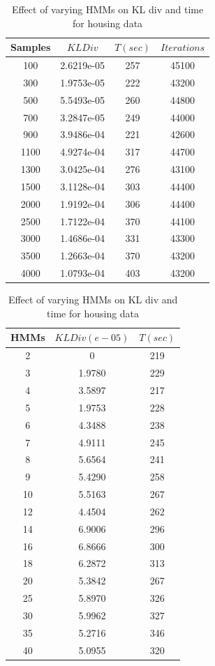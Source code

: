 \documentclass[conference]{IEEEtran}
\begin{document}
\begin{table}[htdp]
\parbox{.51\linewidth}{
\centering
\begin{tabular}{| c | c | c | c |}
\hline
Samples & $KL Div$ & $T(sec)$ & $Iterations$ \\
\hline
100 & 2.6219e-05 & 257 & 45100 \\
300 & 1.9753e-05 & 222 & 43200 \\
500 & 5.5493e-05 & 260 & 44800 \\
700 & 3.2847e-05 & 249 & 44000 \\
900 & 3.9486e-04 & 221 & 42600 \\
1100 & 4.9274e-04 & 317 & 44700 \\
1300 & 3.0425e-04 & 276 & 43100 \\
1500 &  3.1128e-04 & 303 & 44400\\
2000 & 1.9192e-04 & 306 & 44400\\
2500 & 1.7122e-04 & 370 & 44100 \\
3000 & 1.4686e-04 & 331 & 43300 \\
3500 & 1.2663e-04 & 370 & 43200 \\
4000 & 1.0793e-04 & 403 & 43200 \\
\hline
\end{tabular}
\caption{Effect of varying samples on KL div for housing data}
\label{table:sample2}
}
\hfill
\parbox{.51\linewidth}{
\centering
\begin{tabular}{| c | c | c |}
\hline
HMMs & $KL Div (e-05)$ & $T(sec)$\\
\hline
2 & 0 & 219 \\
3 & 1.9780 & 229 \\
4 & 3.5897 & 217 \\
5 & 1.9753 & 228 \\
6 & 4.3488 & 238 \\
7 & 4.9111 & 245  \\
8 & 5.6564 & 241 \\
9 & 5.4290 & 258 \\
10 & 5.5163 & 267 \\
12 & 4.4504 & 262 \\
14 & 6.9006 & 296 \\
16 & 6.8666 & 300 \\
18 & 6.2872 & 313 \\
20 & 5.3842 & 267 \\
25 & 5.8970 & 326 \\
30 & 5.9962 & 327  \\
35 & 5.2716 & 346 \\
40 & 5.0955 & 320 \\
\hline
\end{tabular}
\caption{Effect of varying HMMs on KL div and time for housing data}
\label{table:expert2}
}
\end{table}
\end{document}
